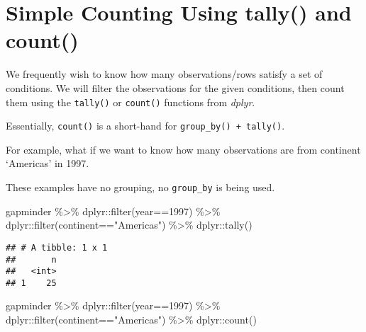 \documentclass[
]{book}
\newenvironment{Shaded}{\begin{snugshade}}{\end{snugshade}}
\newcommand{\DecValTok}[1]{\textcolor[rgb]{0.00,0.00,0.81}{#1}}
\newcommand{\FunctionTok}[1]{\textcolor[rgb]{0.00,0.00,0.00}{#1}}
\newcommand{\NormalTok}[1]{#1}
\newcommand{\SpecialCharTok}[1]{\textcolor[rgb]{0.00,0.00,0.00}{#1}}
\newcommand{\StringTok}[1]{\textcolor[rgb]{0.31,0.60,0.02}{#1}}
\begin{document}
\hypertarget{simple-counting-using-tally-and-count}{%
\section{Simple Counting Using tally() and count()}\label{simple-counting-using-tally-and-count}}

We frequently wish to know how many observations/rows satisfy a set of conditions. We will filter the observations for the given conditions, then count them using the \texttt{tally()} or \texttt{count()} functions from \emph{dplyr}.

Essentially, \texttt{count()} is a short-hand for \texttt{group\_by()\ +\ tally()}.

For example, what if we want to know how many observations are from continent `Americas' in 1997.

These examples have no grouping, no \texttt{group\_by} is being used.

\begin{Shaded}
\begin{Highlighting}[]
\NormalTok{gapminder }\SpecialCharTok{\%\textgreater{}\%} 
\NormalTok{  dplyr}\SpecialCharTok{::}\FunctionTok{filter}\NormalTok{(year}\SpecialCharTok{==}\DecValTok{1997}\NormalTok{) }\SpecialCharTok{\%\textgreater{}\%}
\NormalTok{  dplyr}\SpecialCharTok{::}\FunctionTok{filter}\NormalTok{(continent}\SpecialCharTok{==}\StringTok{"Americas"}\NormalTok{) }\SpecialCharTok{\%\textgreater{}\%}
\NormalTok{  dplyr}\SpecialCharTok{::}\FunctionTok{tally}\NormalTok{()}
\end{Highlighting}
\end{Shaded}

\begin{verbatim}
## # A tibble: 1 x 1
##       n
##   <int>
## 1    25
\end{verbatim}

\begin{Shaded}
\begin{Highlighting}[]
\NormalTok{gapminder }\SpecialCharTok{\%\textgreater{}\%} 
\NormalTok{  dplyr}\SpecialCharTok{::}\FunctionTok{filter}\NormalTok{(year}\SpecialCharTok{==}\DecValTok{1997}\NormalTok{) }\SpecialCharTok{\%\textgreater{}\%}
\NormalTok{  dplyr}\SpecialCharTok{::}\FunctionTok{filter}\NormalTok{(continent}\SpecialCharTok{==}\StringTok{"Americas"}\NormalTok{) }\SpecialCharTok{\%\textgreater{}\%}
\NormalTok{  dplyr}\SpecialCharTok{::}\FunctionTok{count}\NormalTok{()}
\end{Highlighting}
\end{Shaded}
\end{document}
